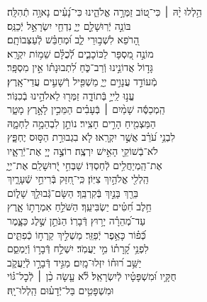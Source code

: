 \documentclass[twoside, openany, parskip=half, 11pt]{book}
\begin{document}
\begin{narrow}
הַ֥לְלוּ יָ֨הּ ׀ \hfill \break
כִּי־ט֭וֹב זַמְּרָ֣ה אֱלֹהֵ֑ינוּ \hfill כִּי־נָ֝עִ֗ים נָאוָ֥ה תְֿהִלָּֽה׃ \\
בּוֹנֵ֣ה יְֿרֽוּשָׁלַ֣‍ִם יְיָ֑ \hfill נִדְחֵ֖י יִשְׂרָאֵ֣ל יְֿכַנֵּֽס׃ \\
הָ֭רֹפֵא לִשְׁב֣וּרֵי לֵ֑ב \hfill וּ֝מְחַבֵּ֗שׁ לְֿעַצְּבוֹתָֽם׃ \\
מוֹנֶ֣ה מִ֭סְפָּר לַכּוֹכָבִ֑ים \hfill לְֿ֝כֻלָּ֗ם שֵׁמ֥וֹת יִקְרָֽא׃ \\
גָּד֣וֹל אֲדוֹנֵ֣ינוּ וְֿרַב־כֹּ֑חַ \hfill לִ֝תְבוּנָת֗וֹ אֵ֣ין מִסְפָּֽר׃ \\
מְֿעוֹדֵ֣ד עֲנָוִ֣ים יְיָ֑ \hfill מַשְׁפִּ֖יל רְֿשָׁעִ֣ים עֲדֵי־אָֽרֶץ׃ \\
עֱנ֣וּ לַֽייָ֣ בְּֿתוֹדָ֑ה \hfill זַמְּר֖וּ לֵאלֹהֵ֣ינוּ בְֿכִנּֽוֹר׃ \\
הַֽמְכַסֶּ֬ה שָׁמַ֨יִם ׀ בְּֿעָבִ֗ים \hfill הַמֵּכִ֣ין לָאָ֣רֶץ מָטָ֑ר\\ הַמַּצְמִ֖יחַ הָרִ֣ים חָצִֽיר׃ \hfill
נוֹתֵ֣ן לִבְהֵמָ֣ה לַחְמָ֑הּ\\ לִבְנֵ֥י עֹ֝רֵ֗ב אֲשֶׁ֣ר יִקְרָֽאוּ׃ \hfill
לֹ֤א בִגְבוּרַ֣ת הַסּ֣וּס יֶחְפָּ֑ץ\\ לֹא־בְֿשׁוֹקֵ֖י הָאִ֣ישׁ יִרְצֶֽה׃ \hfill
רוֹצֶ֣ה יְיָ֭ אֶת־יְֿרֵאָ֑יו\\ אֶת־הַֽמְיַחֲלִ֥ים לְֿחַסְדּֽוֹ׃ \hfill
שַׁבְּחִ֣י יְֿ֭רוּשָׁלַ‍ִם אֶת־יְיָ֑\\ הַֽלְלִ֖י אֱלֹהַ֣יִךְ צִיּֽוֹן׃ \hfill
כִּֽי־חִ֭זַּק בְּֿרִיחֵ֣י שְֿׁעָרָ֑יִךְ\\ בֵּרַ֖ךְ בָּנַ֣יִךְ בְּֿקִרְבֵּֽךְ׃ \hfill
הַשָּׂם־גְּֿבוּלֵ֥ךְ שָׁל֑וֹם\\ חֵ֥לֶב חִ֝טִּ֗ים יַשְׂבִּיעֵֽךְ׃ \hfill
הַשֹּׁלֵ֣חַ אִמְרָת֣וֹ אָ֑רֶץ\\ עַד־מְ֝הֵרָ֗ה יָר֥וּץ דְּֿבָרֽוֹ׃ \hfill
הַנֹּתֵ֣ן שֶׁ֣לֶג כַּצָּ֑מֶר\\ כְּֿ֝פ֗וֹר כָּאֵ֥פֶר יְֿפַזֵּֽר׃ \hfill
מַשְׁלִ֣יךְ קַֽרְח֣וֹ כְֿפִתִּ֑ים\\ לִפְנֵ֥י קָ֝רָת֗וֹ מִ֣י יַעֲמֹֽד׃ \hfill
יִשְׁלַ֣ח דְּֿבָר֣וֹ וְֿיַמְסֵ֑ם\\ יַשֵּׁ֥ב ר֝וּח֗וֹ יִזְּלוּ־מָֽיִם׃ \hfill
מַגִּ֣יד דְּֿבָרָ֣ו לְֿיַעֲקֹ֑ב\\ חֻקָּ֥יו וּ֝מִשְׁפָּטָ֗יו לְֿיִשְׂרָאֵֽל׃ \hfill
לֹ֘א עָ֤שָׂה כֵ֨ן ׀ לְֿכׇל־גּ֗וֹי\\ וּמִשְׁפָּטִ֥ים בַּל־יְֿדָע֗וּם \hfill הַֽלְלוּ־יָֽהּ׃




\end{narrow}
\end{document}
